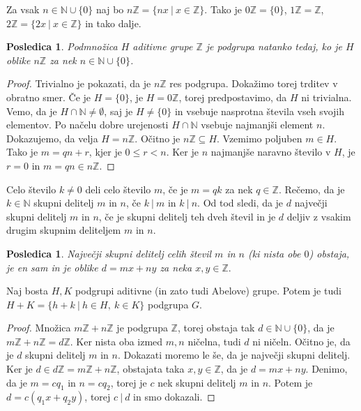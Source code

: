 \documentclass[10pt, a4paper]{article}
\newtheorem{posledica}[izr]{Posledica}
\newenvironment{noticeC}{%
  \tcolorbox[%
  notitle,
  empty,
  enhanced,  %
  breakable,
  coltext=black, 
  fontupper=\rmfamily,
  parbox=false,
  noparskip,
  sharp corners,
  boxrule=-1pt,  %
  frame hidden,
  left=7pt,  %
  right=7pt,
  top=5pt,
  bottom=5pt,
  before skip=2.5ex plus 2pt,
  after skip=2.5ex plus 2pt,
  overlay unbroken and last={%
  },
  ]}
{\endtcolorbox}
\newenvironment{dokaz}%
  {\begin{noticeC}\begin{proof}}%
  {\end{proof}\end{noticeC}}
\newcommand{\N}{\mathbb {N}}
\newcommand{\Z}{\mathbb {Z}}
\begin{document}
Za vsak $n \in \N \cup \{0\}$ naj bo $n \Z = \{nx\ |\ x \in \Z\}$.
Tako je $0\Z = \{0\}$, $1 \Z = \Z$, $2 \Z = \{2x\ |\ x \in \Z\}$ in tako dalje.

\begin{posledica}
  Podmnožica $H$ aditivne grupe $\Z$ je podgrupa natanko tedaj, ko je $H$ oblike $n \Z$ za nek $n \in \N \cup \{0\}$.
\end{posledica}

\begin{dokaz}
  Trivialno je pokazati, da je $n \Z$ res podgrupa.
  Dokažimo torej trditev v obratno smer.
  Če je $H = \{0\}$, je $H = 0\Z$, torej predpostavimo, da $H$ ni trivialna.
  Vemo, da je $H \cap \N \neq \emptyset$, saj je $H \neq \{0\}$ in vsebuje nasprotna števila vseh svojih elementov.
  Po načelu dobre urejenosti $H \cap \N$ vsebuje najmanjši element $n$.
  Dokazujemo, da velja $H = n \Z$. Očitno je $n \Z \subseteq H$.
  Vzemimo poljuben $m \in H$.
  Tako je $m = qn + r$, kjer je $0 \leq r < n$.
  Ker je $n$ najmanjše naravno število v $H$, je $r = 0$ in $m = qn \in n\Z$. 
\end{dokaz}

Celo število $k \neq 0$ deli celo število $m$, če je $m = qk$ za nek $q \in \Z.$
Rečemo, da je $k \in \N$ skupni delitelj $m$ in $n$, če $k\ |\ m$ in $k\ |\ n$.
Od tod sledi, da je $d$ največji skupni delitelj $m$ in $n$, 
če je skupni delitelj teh dveh števil in je $d$ deljiv z vsakim drugim skupnim deliteljem $m$ in $n$.

\begin{posledica}
  Največji skupni delitelj celih števil $m$ in $n$ (ki nista obe $0$) obstaja, je en sam 
  in je oblike $d = mx + n y$ za neka $x, y \in \Z.$
\end{posledica}

Naj bosta $H, K$ podgrupi aditivne (in zato tudi Abelove) grupe.
Potem je tudi $H + K = \{h + k\ |\ h \in H,\ k \in K\}$ podgrupa $G$.

\begin{dokaz}
  Množica $m\Z + n\Z$ je podgrupa $\Z$, torej obstaja tak $d \in \N \cup \{0\}$, da je $m\Z + n\Z = d\Z$.
  Ker nista oba izmed $m, n$ ničelna, tudi $d$ ni ničeln.
  Očitno je, da je $d$ skupni delitelj $m$ in $n$. Dokazati moremo le še, da je največji skupni delitelj.
  Ker je $d \in d\Z = m \Z + n \Z$, obstajata taka $x, y \in \Z$, da je $d = mx + ny$.
  Denimo, da je $m = c q_1$ in $n = c q_2$, torej je $c$ nek skupni delitelj $m$ in $n$.
  Potem je $d = c(q_1 x + q_2 y)$, torej $c\ |\ d$ in smo dokazali.
\end{dokaz}
\end{document}
